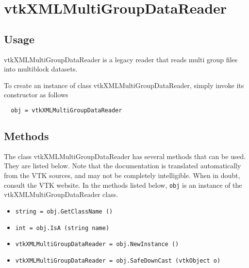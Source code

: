 \section{vtkXMLMultiGroupDataReader}

\subsection{Usage}

 vtkXMLMultiGroupDataReader is a legacy reader that reads multi group files
 into multiblock datasets.

To create an instance of class vtkXMLMultiGroupDataReader, simply
invoke its constructor as follows
\begin{verbatim}
  obj = vtkXMLMultiGroupDataReader
\end{verbatim}
\subsection{Methods}

The class vtkXMLMultiGroupDataReader has several methods that can be used.
  They are listed below.
Note that the documentation is translated automatically from the VTK sources,
and may not be completely intelligible.  When in doubt, consult the VTK website.
In the methods listed below, \verb|obj| is an instance of the vtkXMLMultiGroupDataReader class.
\begin{itemize}
\item  \verb|string = obj.GetClassName ()|

\item  \verb|int = obj.IsA (string name)|

\item  \verb|vtkXMLMultiGroupDataReader = obj.NewInstance ()|

\item  \verb|vtkXMLMultiGroupDataReader = obj.SafeDownCast (vtkObject o)|

\end{itemize}
